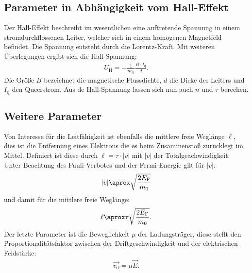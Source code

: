 \subsection{Parameter in Abhängigkeit vom Hall-Effekt}
Der Hall-Effekt beschreibt im wesentlichen eine auftretende Spannung in einem stromdurchflossenen Leiter, welcher sich in
einem homogenen Magnetfeld befindet. Die Spannung entsteht durch die Lorentz-Kraft.
Mit weiteren Überlegungen ergibt sich die Hall-Spannung:
\begin{align}
 U_\mathrm{H}=-\frac{1}{ne_0}\frac{B\cdot I_\mathrm{q}}{d}.
\end{align}
Die Größe $B$ bezeichnet die magnetische Flussdichte, $d$ die Dicke des Leiters und $I_\mathrm{q}$ den Queerstrom.
Aus de Hall-Spannung lassen sich nun auch $n$ und $\tau$ berechen.

\subsection{Weitere Parameter}
Von Interesse für die Leitfähigkeit ist ebenfalls die mittlere freie Weglänge $\ell$, dies ist die Entfernung eines Elektrons die
es beim Zusammenstoß zurücklegt im Mittel. Definiert ist diese durch $\ell=\tau\cdot|v|$ mit $|v|$ der Totalgeachwindigkeit.
Unter Beachtung des Pauli-Verbotes und der Fermi-Energie gilt für $|v|$:
\begin{align}
|v|\aprox \sqrt{\frac{2E_\mathrm{F}}{m_0}}
\end{align}
und damit für die mittlere freie Weglänge:
\begin{align}
\ell \aprox \tau\sqrt{\frac{2 E_\mathrm{F}}{m_0}}.
\end{align}
Der letzte Parameter ist die Beweglichkeit $\mu$ der Ladungsträger, diese stellt den Proportionalitätsfaktor
zwischen der Driftgeschwindigkeit und der elektrischen Feldstärke:
\begin{align}
\vec{v_\mathrm{d}}=\mu \vec{E}.
\end{align}
